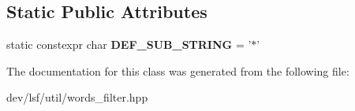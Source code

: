 \subsection*{Static Public Attributes}
\begin{DoxyCompactItemize}
\item 
\hypertarget{classlsf_1_1util_1_1WordsFilter_aa09fb65f1a27a38c258cee2b214c5683}{
static constexpr char {\bfseries DEF\_\-SUB\_\-STRING} = '$\ast$'}
\label{classlsf_1_1util_1_1WordsFilter_aa09fb65f1a27a38c258cee2b214c5683}

\end{DoxyCompactItemize}


The documentation for this class was generated from the following file:\begin{DoxyCompactItemize}
\item 
dev/lsf/util/words\_\-filter.hpp\end{DoxyCompactItemize}

